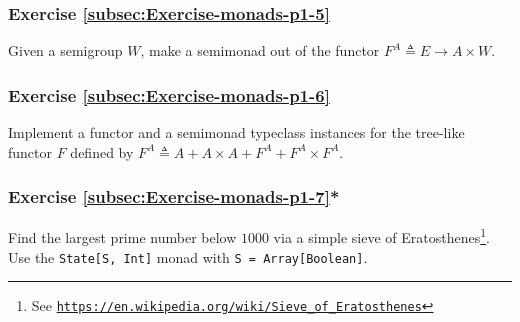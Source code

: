 \subsubsection{Exercise \label{subsec:Exercise-monads-p1-5}\ref{subsec:Exercise-monads-p1-5}}

Given a semigroup $W$, make a semimonad out of the functor $F^{A}\triangleq E\rightarrow A\times W$.

\subsubsection{Exercise \label{subsec:Exercise-monads-p1-6}\ref{subsec:Exercise-monads-p1-6}}

Implement a functor and a semimonad typeclass instances for the tree-like
functor $F$ defined by $F^{A}\triangleq A+A\times A+F^{A}+F^{A}\times F^{A}$.

\subsubsection{Exercise \label{subsec:Exercise-monads-p1-7}\ref{subsec:Exercise-monads-p1-7}{*}}

Find the largest prime number below $1000$ via a simple sieve of
Eratosthenes\footnote{See \texttt{\href{https://en.wikipedia.org/wiki/Sieve_of_Eratosthenes}{https://en.wikipedia.org/wiki/Sieve\_of\_Eratosthenes}}}.
Use the \lstinline!State[S, Int]! monad with \lstinline!S = Array[Boolean]!.

